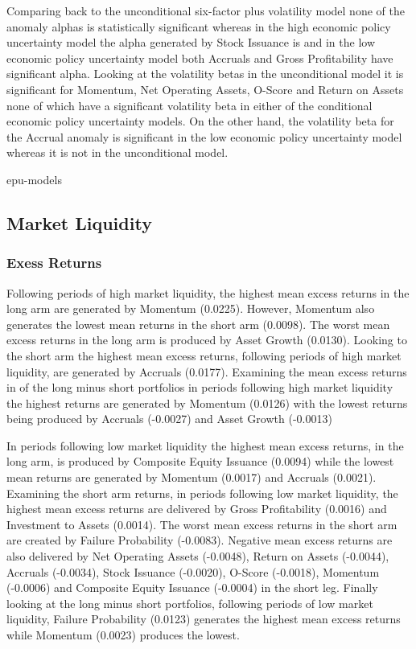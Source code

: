 \documentclass[a4paper,12pt]{article}                 %
\begin{document}
Comparing back to the unconditional six-factor plus volatility model none of the anomaly alphas is statistically significant whereas in the high economic policy uncertainty model the alpha generated by Stock Issuance is and in the low economic policy uncertainty model both Accruals and Gross Profitability have significant alpha. Looking at the volatility betas in the unconditional model it is significant for Momentum, Net Operating Assets, O-Score and Return on Assets none of which have a significant volatility beta in either of the conditional economic policy uncertainty models. On the other hand, the volatility beta for the Accrual anomaly is significant in the low economic policy uncertainty model whereas it is not in the unconditional model.

{epu-models}

\FloatBarrier
\subsection{Market Liquidity}
\subsubsection{Exess Returns}
Following periods of high market liquidity, the highest mean excess returns in the long arm are generated by Momentum (0.0225). However, Momentum also generates the lowest mean returns in the short arm (0.0098). The worst mean excess returns in the long arm is produced by Asset Growth (0.0130). Looking to the short arm the highest mean excess returns, following periods of high market liquidity, are generated by Accruals (0.0177). Examining the mean excess returns in of the long minus short portfolios in periods following high market liquidity the highest returns are generated by Momentum (0.0126) with the lowest returns being produced by Accruals (-0.0027) and Asset Growth (-0.0013)

In periods following low market liquidity the highest mean excess returns, in the long arm, is produced by Composite Equity Issuance (0.0094) while the lowest mean returns are generated by Momentum (0.0017) and Accruals (0.0021). Examining the short arm returns, in periods following low market liquidity, the highest mean excess returns are delivered by Gross Profitability (0.0016) and Investment to Assets (0.0014). The worst mean excess returns in the short arm are created by Failure Probability (-0.0083). Negative mean excess returns are also delivered by Net Operating Assets (-0.0048), Return on Assets (-0.0044), Accruals (-0.0034), Stock Issuance (-0.0020), O-Score (-0.0018), Momentum (-0.0006) and Composite Equity Issuance (-0.0004) in the short leg. Finally looking at the long minus short portfolios, following periods of low market liquidity, Failure Probability (0.0123) generates the highest mean excess returns while Momentum (0.0023) produces the lowest.
\end{document}

